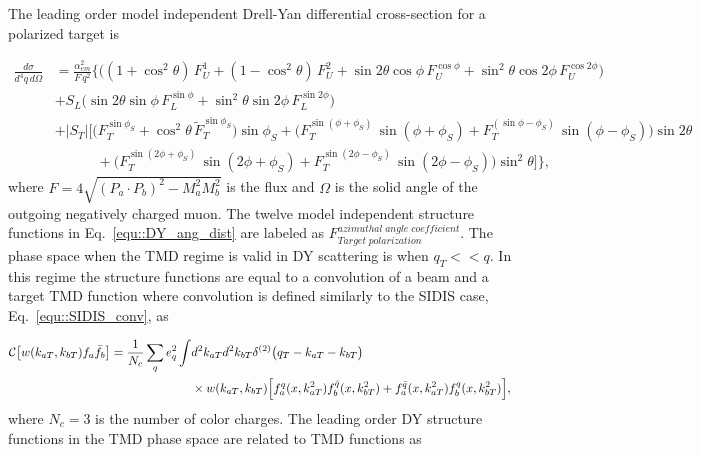 The leading order model independent Drell-Yan differential cross-section for a
polarized target is~\cite{DYxSection,AKotzininaNote}

\begin{align} \label{equ::DY_ang_dist}
  \frac{d\sigma}{d^4 q \, d \Omega} &=
  \frac{\alpha_{em}^2}{F \, q^2}
  \Big \{ \Big(
   (1 + \cos^2 \theta) \, F_{U}^{1} 
 + (1 - \cos^2 \theta) \, F_{U}^{2} 
 + \sin 2\theta \cos \phi \, F_{U}^{\cos \phi} 
 + \sin^2 \theta \cos 2\phi \, F_{U}^{\cos 2\phi} \Big)
 \nonumber \\
 &+ S_{L} \Big( 
   \sin 2\theta \sin \phi \, F_{L}^{\sin \phi} 
   + \sin^2 \theta \sin 2\phi \, F_{L}^{\sin 2\phi} \Big)
   \nonumber \\
   &+ |S_{T}|
   \Big[ \Big(
     F_{T}^{\sin \phi_S} + \cos^2 \theta \, \tilde{F}_{T}^{\sin \phi_S}
     \Big)\sin \phi_{S} 
     + \Big( F_{T}^{\sin (\phi +\phi_S)} \, \sin(\phi+\phi_S) +
     F_{T}^{(\sin \phi - \phi_S)}\, \sin(\phi-\phi_S) \Big)\sin 2\theta
     \nonumber \\
     & \quad\quad\quad +
     \Big( F_{T}^{\sin (2\phi +\phi_S)}\, \sin(2\phi+\phi_S) +
     F_{T}^{\sin (2\phi - \phi_S)}\, \sin(2\phi-\phi_S) \Big)\sin ^2\theta
     \Big ]
   \Big \},
\end{align}
\noindent
where $F = 4\sqrt{(P_a \cdot P_b)^2 - M_a^2M_b^2}$ is the flux and $\Omega$ is
the solid angle of the outgoing negatively charged muon.  The twelve model
independent structure functions in Eq.~\ref{equ::DY_ang_dist} are labeled as
$F_{Target \; polarization}^{azimuthal \;angle\;coefficient}$.  The phase space
when the TMD regime is valid in DY scattering is when $q_T << q$.  In this
regime the structure functions are equal to a convolution of a beam and a target
TMD function where convolution is defined similarly to the SIDIS case,
Eq.~\ref{equ::SIDIS_conv}, as

\begin{align}
  \label{equ::DY_conv}
  \nonumber
      {\cal C}\bigl[ w(k_{aT}, k_{bT}) f_a \bar{f}_b \bigr] =
      \frac{1}{N_c} \sum_q e_q^2 \int &d^2 k_{aT} d^2 k_{bT} 
      \delta^{(2)}\bigl(q_T - k_{aT} - k_{bT} \bigr) \\
      &\times w(k_{aT},k_{bT})
        \Big[ f_a^q(x,k_{aT}^2)f_b^{\bar{q}}(x,k_{bT}^2) +
          f_a^{\bar{q}}(x,k_{aT}^2)f_b^{q}(x,k_{bT}^2) \Big],
\end{align}
\noindent
where $N_c = 3$ is the number of color charges.  The leading order DY
structure functions in the TMD phase space are related to TMD functions
as~\cite{DYxSection}

